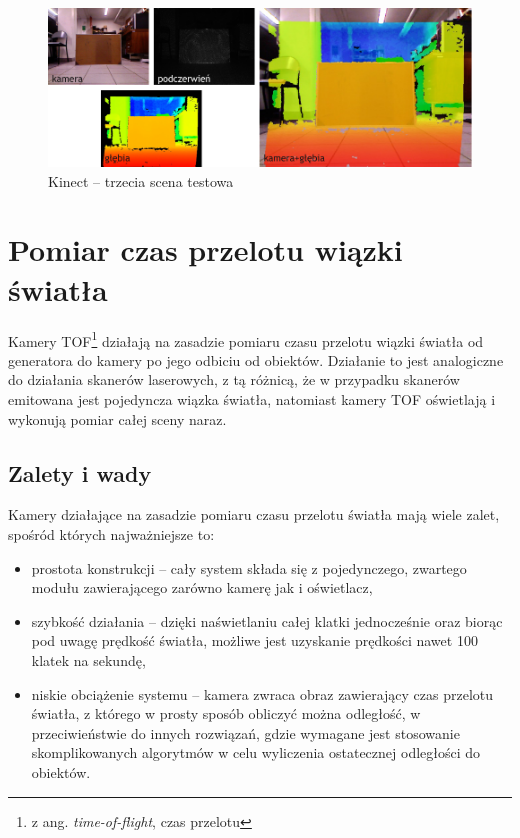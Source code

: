 \begin{figure}[h!]
\centering
\includegraphics{../img/kinect_3}
\caption[Kinect -- trzecia scena testowa]{Kinect -- trzecia scena testowa}
\label{fig:kinect_3}
\end{figure}

\section{Pomiar czas przelotu wiązki światła}

Kamery TOF\footnote{z ang. {\it time-of-flight}, czas przelotu} działają na zasadzie
pomiaru czasu przelotu wiązki światła od generatora do kamery po jego odbiciu od
obiektów. Działanie to jest analogiczne do działania skanerów laserowych, z tą różnicą,
że w przypadku skanerów emitowana jest pojedyncza wiązka światła, natomiast kamery TOF
oświetlają i wykonują pomiar całej sceny naraz.

\subsection{Zalety i wady}

Kamery działające na zasadzie pomiaru czasu przelotu światła mają wiele zalet, spośród
których najważniejsze to:

\begin{itemize}
\item prostota konstrukcji -- cały system składa się z pojedynczego, zwartego
modułu zawierającego zarówno kamerę jak i oświetlacz,
\item szybkość działania -- dzięki naświetlaniu całej klatki jednocześnie oraz
biorąc pod uwagę prędkość światła, możliwe jest uzyskanie prędkości nawet 100 klatek
na sekundę,
\item niskie obciążenie systemu -- kamera zwraca obraz zawierający czas przelotu
światła, z którego w prosty sposób obliczyć można odległość, w przeciwieństwie do
innych rozwiązań, gdzie wymagane jest stosowanie skomplikowanych algorytmów w celu
wyliczenia ostatecznej odległości do obiektów.
\end{itemize}

